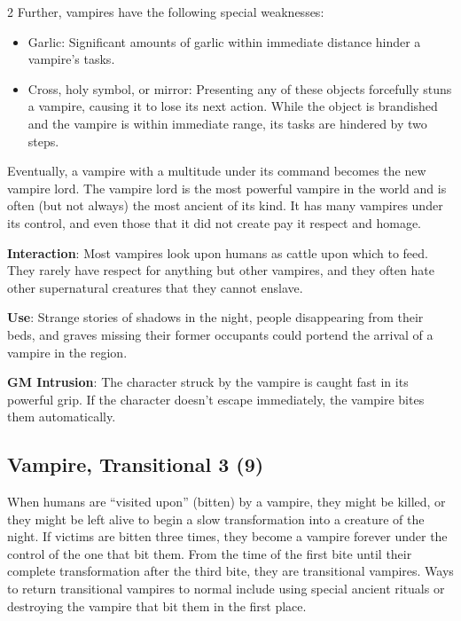 \begin{multicols}{2}
Further, vampires have the following special weaknesses: 

\begin{itemize}
\item Garlic: Significant amounts of garlic within immediate distance hinder a vampire’s tasks.
\item Cross, holy symbol, or mirror: Presenting any of these objects forcefully stuns a vampire, causing it to lose its next action. While the object is brandished and the vampire is within immediate range, its tasks are hindered by two steps.
\end{itemize}

Eventually, a vampire with a multitude under its command becomes the new vampire lord. The vampire lord is the most powerful vampire in the world and is often (but not always) the most ancient of its kind. It has many vampires under its control, and even those that it did not create pay it respect and homage.

\textbf{Interaction}: Most vampires look upon humans as cattle upon which to feed. They rarely have respect for anything but other vampires, and they often hate other supernatural creatures that they cannot enslave.

\textbf{Use}: Strange stories of shadows in the night, people disappearing from their beds, and graves missing their former occupants could portend the arrival of a vampire in the region. 

\textbf{GM Intrusion}: The character struck by the vampire is caught fast in its powerful grip. If the character doesn’t escape immediately, the vampire bites them automatically.

\subsection{Vampire, Transitional	3 (9)}

When humans are “visited upon” (bitten) by a vampire, they might be killed, or they might be left alive to begin a slow transformation into a creature of the night. If victims are bitten three times, they become a vampire forever under the control of the one that bit them. From the time of the first bite until their complete transformation after the third bite, they are transitional vampires. Ways to return transitional vampires to normal include using special ancient rituals or destroying the vampire that bit them in the first place.


\end{multicols}
